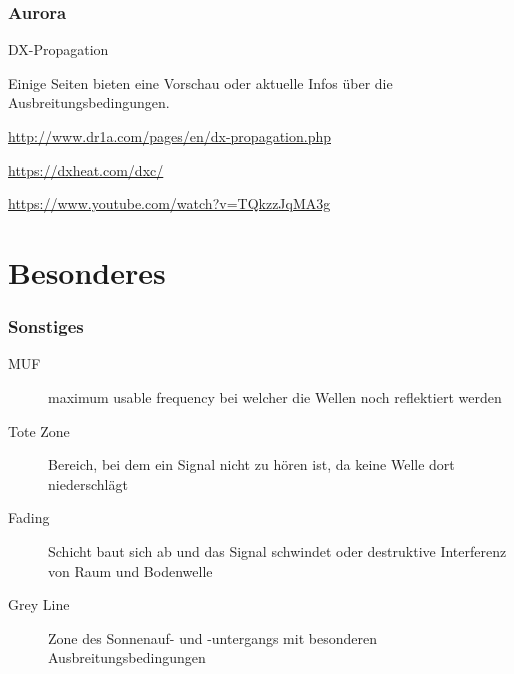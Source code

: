 \begin{frame}
  \frametitle{Aurora}
  \begin{center}
    \begin{block}{DX-Propagation}
    \item Einige Seiten bieten eine Vorschau oder aktuelle Infos über die Ausbreitungsbedingungen.
    \item \url{http://www.dr1a.com/pages/en/dx-propagation.php}
    \item \url{https://dxheat.com/dxc/}
    \item \url{https://www.youtube.com/watch?v=TQkzzJqMA3g}
    \end{block}
  \end{center}
\end{frame}

\section*{Besonderes}

\begin{frame}
  \frametitle{Sonstiges}
  \begin{description}
    \item[MUF] maximum usable frequency bei welcher die Wellen noch reflektiert werden
    \item[Tote Zone] Bereich, bei dem ein Signal nicht zu hören ist, da keine Welle dort niederschlägt
    \item[Fading] Schicht baut sich ab und das Signal schwindet oder destruktive Interferenz von Raum und Bodenwelle
    \item[Grey Line] Zone des Sonnenauf- und -untergangs mit besonderen Ausbreitungsbedingungen
  \end{description}
\end{frame}


